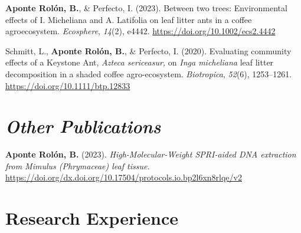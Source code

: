 \documentclass[11pt,a4paper,]{awesome-cv}
\newlength{\cslhangindent}
\newenvironment{CSLReferences}[2] %
 {\begin{list}{}{%
  \setlength{\itemindent}{0pt}
  \setlength{\leftmargin}{0pt}
  \setlength{\parsep}{0pt}
  \ifodd #1
   \setlength{\leftmargin}{\cslhangindent}
   \setlength{\itemindent}{-1\cslhangindent}
  \fi
  \setlength{\itemsep}{#2\baselineskip}}}
 {\end{list}}
\begin{document}
\label{refs-9f84bd10e097ee738a8eb225e41dcd56}
\begin{CSLReferences}{1}{0}
\textbf{Aponte Rolón, B.}, \& Perfecto, I. (2023). Between two trees:
Environmental effects of I. Micheliana and A. Latifolia on leaf litter
ants in a coffee agroecosystem. \emph{Ecosphere}, \emph{14}(2), e4442.
\url{https://doi.org/10.1002/ecs2.4442}

Schmitt, L., \textbf{Aponte Rolón, B.}, \& Perfecto, I. (2020).
Evaluating community effects of a Keystone Ant,
\emph{Azteca sericeasur,} on \emph{Inga micheliana} leaf litter
decomposition in a shaded coffee agro-ecosystem. \emph{Biotropica},
\emph{52}(6), 1253--1261. \url{https://doi.org/10.1111/btp.12833}

\end{CSLReferences}

\section{\texorpdfstring{ \emph{Other
Publications}}{ Other Publications}}\label{other-publications}

\label{refs-9c97e696cc6d6fa4babf22c263f6c715}
\begin{CSLReferences}{1}{0}
\textbf{Aponte Rolón, B.} (2023). \emph{High-Molecular-Weight SPRI-aided
DNA extraction from Mimulus (Phrymaceae) leaf tissue.}
\url{https://doi.org/dx.doi.org/10.17504/protocols.io.bp2l6xn8rlqe/v2}

\end{CSLReferences}

\section{\texorpdfstring{ Research
Experience}{ Research Experience}}\label{research-experience}
\end{document}
